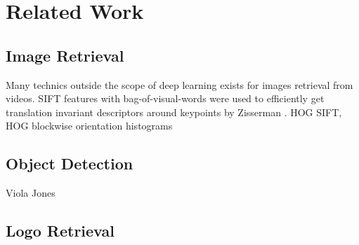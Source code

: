 \chapter{Related Work}\label{c:c-relatedwork}

\section{Image Retrieval}

Many technics outside the scope of deep learning exists for images retrieval from videos. SIFT features \cite{Lowe:2004:DIF:993451.996342} with bag-of-visual-words were used to efficiently get translation invariant descriptors around keypoints by Zisserman \cite{Sivic:2003:VGT:946247.946751}. HOG \cite{Dalal:2005:HOG:1068507.1069007} SIFT, HOG blockwise orientation histograms

\section{Object Detection}\label{s:c-objectdetection}
Viola Jones

\section{Logo Retrieval}
